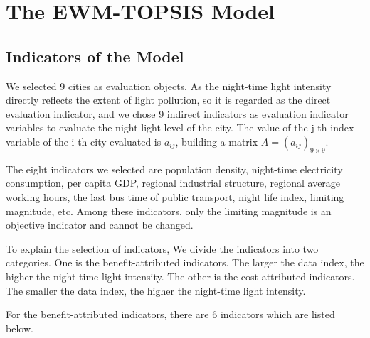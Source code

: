 \MinParskip{}

\section{The EWM-TOPSIS Model}

\subsection{Indicators of the Model}
We selected 9 cities as evaluation objects. As the night-time light intensity directly reflects the extent of light pollution, so it is regarded as the direct evaluation indicator, and we chose 9 indirect indicators as evaluation indicator variables to evaluate the night light level of the city. 
The value of the j-th index variable of the i-th city evaluated is $a_{ij}$, building a matrix $A=(a_{ij})_{9\times9}$.

The eight indicators we selected are population density, night-time electricity consumption, per capita GDP, regional industrial structure, regional average working hours, the last bus time of public transport, night life index, limiting magnitude, etc. Among these indicators, only the limiting magnitude is an objective indicator and cannot be changed.

To explain the selection of indicators, We divide the indicators into two categories. One is the benefit-attributed indicators. The larger the data index, the higher the night-time light intensity. The other is the cost-attributed indicators. The smaller the data index, the higher the night-time light intensity.

For the benefit-attributed indicators, there are 6 indicators which are listed below.

